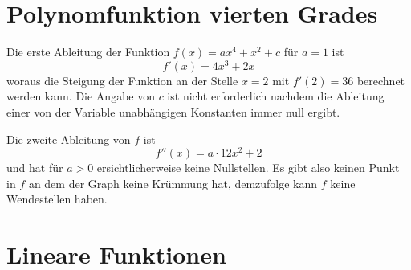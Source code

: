 \documentclass[a4paper]{article}
\begin{document}
\section{Polynomfunktion vierten Grades}

\begin{tasks}
    \item Die erste Ableitung der Funktion $f(x) = ax^4 + x^2 + c$ für $a = 1$ ist
    \begin{equation*}
        f'(x) = 4x^3 + 2x
    \end{equation*}
    woraus die Steigung der Funktion an der Stelle $x = 2$ mit $f'(2) = 36$ berechnet werden kann. Die Angabe von $c$ ist nicht erforderlich nachdem die Ableitung einer von der Variable unabhängigen Konstanten immer null ergibt.

    \item Die zweite Ableitung von $f$ ist
    \begin{equation*}
        f''(x) = a \cdot 12x^2 + 2
    \end{equation*}
    und hat für $a > 0$ ersichtlicherweise keine Nullstellen. Es gibt also keinen Punkt in $f$ an dem der Graph keine Krümmung hat, demzufolge kann $f$ keine Wendestellen haben.
\end{tasks}

\section{Lineare Funktionen}
\end{document}
